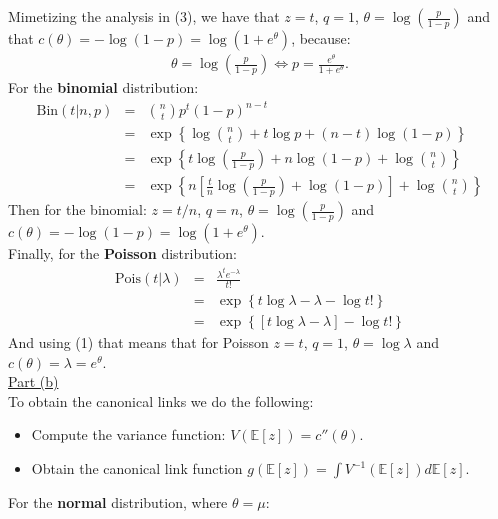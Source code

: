 \documentclass[a4paper, 11pt]{article}
\begin{document}
Mimetizing the analysis in (3), we have that $z=t$, $q=1$, $\theta = \log \left( \frac{p}{1-p} \right)$ and that $c(\theta) = -\log{(1-p)} = \log(1 + e^\theta)$, because:
\begin{eqnarray}
\theta = \log \left( \frac{p}{1-p} \right) \Leftrightarrow p = \frac{e^\theta}{1 + e^\theta}.
\end{eqnarray}
For the \textbf{binomial} distribution:
\begin{eqnarray}
\text{Bin}(t | n,p) &=& {n \choose t} p^t (1-p)^{n-t}   \nonumber \\
&=& \exp \left\{ \log{n \choose t} + t \log p + (n-t) \log{(1-p)} \right\} \nonumber \\
&=& \exp \left\{ t \log \left( \frac{p}{1-p} \right) + n \log{(1-p)} + \log{n \choose t} \right\} \nonumber \\
&=& \exp \left\{ n \left[ \frac{t}{n} \log\left( \frac{p}{1-p} \right) + \log{(1-p)} \right] + \log{n \choose t} \right\} \nonumber
\end{eqnarray}
Then for the binomial: $z = t/n$, $q=n$, $\theta = \log \left( \frac{p}{1-p} \right)$ and $c(\theta) = -\log{(1-p)} = \log(1 + e^\theta)$.\\
\newline Finally, for the \textbf{Poisson} distribution:
\begin{eqnarray}
\text{Pois}(t | \lambda) &=& \frac{\lambda^t e^{-\lambda}}{t!} \nonumber \\
&=& \exp \left\{ t \log \lambda - \lambda - \log t! \right\} \nonumber \\
&=& \exp \left\{ [t \log \lambda - \lambda] - \log t! \right\} \nonumber
\end{eqnarray}
And using (1) that means that for Poisson $z=t$, $q = 1$, $\theta = \log \lambda$ and $c(\theta) =\lambda = e^\theta$.\\
\newline \underline{Part (b)}\\
\newline To obtain the canonical links we do the following:
\begin{itemize}
\item Compute the variance function: $V(\mathbb{E}[z]) = c''(\theta)$.
\item Obtain the canonical link function $g(\mathbb{E}[z]) = \int V^{-1}(\mathbb{E}[z]) d\mathbb{E}[z]$.
\end{itemize}
For the \textbf{normal} distribution, where $\theta = \mu$:
\end{document}
